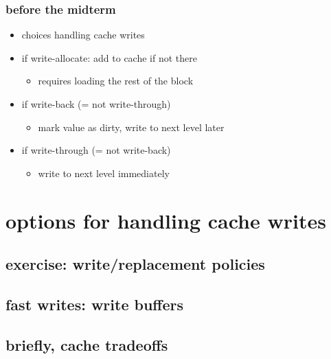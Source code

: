\date{}
\title{}
\date{}

\begin{frame}
    \titlepage
\end{frame}

\begin{frame}
\frametitle{before the midterm}
\begin{itemize}
\item choices handling cache writes
\item if write-allocate: add to cache if not there
    \begin{itemize}
    \item requires loading the rest of the block
    \end{itemize}
\item if write-back (= not write-through)
    \begin{itemize}
    \item mark value as dirty, write to next level later
    \end{itemize}
\item if write-through (= not write-back)
    \begin{itemize}
    \item write to next level immediately
    \end{itemize}
\end{itemize}
\end{frame}

\section{options for handling cache writes}


\subsection{exercise: write/replacement policies}


\subsection{fast writes: write buffers}


\subsection{briefly, cache tradeoffs}



